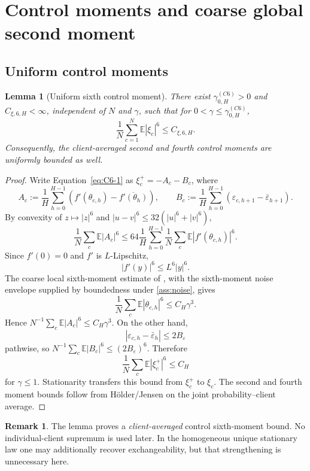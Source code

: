 \documentclass[11pt]{article}
\newtheorem{lemma}[lemma]{Lemma}
\theoremstyle{definition}
\newtheorem{remark}[remark]{Remark}
\newcommand{\E}{\mathbb{E}}
\newcommand{\eps}{\varepsilon}
\begin{document}
\section{Control moments and coarse global second moment}
\label{sec:coarse}

\subsection{Uniform control moments}

\begin{lemma}[Uniform sixth control moment]
\label{lem:control-sixth}
There exist $\gamma_{0,H}^{(C6)}>0$ and $C_{\xi,6,H}<\infty$, independent of $N$ and $\gamma$, such that for $0<\gamma\le\gamma_{0,H}^{(C6)}$,
\begin{equation}
\label{eq:control-sixth}
  \frac1N\sum_{c=1}^N\E|\xi_c|^6\le C_{\xi,6,H}.
\end{equation}
Consequently, the client-averaged second and fourth control moments are uniformly bounded as well.
\end{lemma}

\begin{proof}
Write Equation~\eqref{eq:C6-1} as $\xi_c^+=-A_c-B_c$, where
\[
  A_c:=\frac1H\sum_{h=0}^{H-1}
  \left(f'(\theta_{c,h})-\overline{f'(\theta_h)}\right),
  \qquad
  B_c:=\frac1H\sum_{h=0}^{H-1}
  (\eps_{c,h+1}-\bar\eps_{h+1}).
\]
By convexity of $z\mapsto |z|^6$ and $|u-v|^6\le 32(|u|^6+|v|^6)$,
\[
  \frac1N\sum_c\E|A_c|^6
  \le 64\frac1H\sum_{h=0}^{H-1}
  \frac1N\sum_c\E|f'(\theta_{c,h})|^6.
\]
Since $f'(0)=0$ and $f'$ is $L$-Lipschitz,
\[
  |f'(y)|^6\le L^6|y|^6.
\]
The coarse local sixth-moment estimate of \citet{mangold2025scaffold}, with the sixth-moment noise envelope supplied by boundedness under \cref{ass:noise}, gives
\[
  \frac1N\sum_c\E|\theta_{c,h}|^6\le C_H\gamma^3.
\]
Hence $N^{-1}\sum_c\E|A_c|^6\le C_H\gamma^3$. On the other hand,
\[
  |\eps_{c,h}-\bar\eps_h|\le 2B_\eps
\]
pathwise, so $N^{-1}\sum_c\E|B_c|^6\le (2B_\eps)^6$. Therefore
\[
  \frac1N\sum_c\E|\xi_c^+|^6\le C_H
\]
for $\gamma\le1$. Stationarity transfers this bound from $\xi_c^+$ to $\xi_c$. The second and fourth moment bounds follow from H\"older/Jensen on the joint probability--client average.
\end{proof}

\begin{remark}
The lemma proves a \emph{client-averaged} control sixth-moment bound. No individual-client supremum is used later. In the homogeneous unique stationary law one may additionally recover exchangeability, but that strengthening is unnecessary here.
\end{remark}
\end{document}
